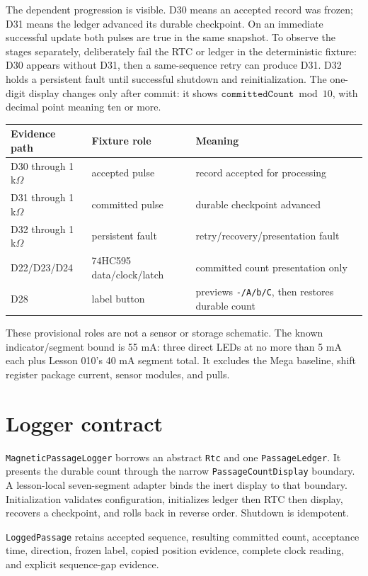 \documentclass[11pt]{article}
\begin{document}
The dependent progression is visible. D30 means an accepted record was frozen;
D31 means the ledger advanced its durable checkpoint. On an immediate
successful update both pulses are true in the same snapshot. To observe the
stages separately, deliberately fail the RTC or ledger in the deterministic
fixture: D30 appears without D31, then a same-sequence retry can produce D31.
D32 holds a persistent fault until successful shutdown and reinitialization.
The one-digit display changes only after commit: it shows
\(\texttt{committedCount}\bmod10\), with decimal point meaning ten or more.

\begin{tabularx}{\linewidth}{@{}l l X@{}}
\toprule
Evidence path & Fixture role & Meaning\\
\midrule
D30 through 1 k\(\Omega\) & accepted pulse & record accepted for processing\\
D31 through 1 k\(\Omega\) & committed pulse & durable checkpoint advanced\\
D32 through 1 k\(\Omega\) & persistent fault & retry/recovery/presentation fault\\
D22/D23/D24 & 74HC595 data/clock/latch & committed count presentation only\\
D28 & label button & previews \texttt{-/A/b/C}, then restores durable count\\
\bottomrule
\end{tabularx}

These provisional roles are not a sensor or storage schematic. The known
indicator/segment bound is 55 mA: three direct LEDs at no more than 5 mA each
plus Lesson 010's 40 mA segment total. It excludes the Mega baseline, shift
register package current, sensor modules, and pulls.

\section{Logger contract}
\texttt{MagneticPassageLogger} borrows an abstract \texttt{Rtc} and one
\texttt{PassageLedger}. It presents the durable count through the narrow
\texttt{PassageCountDisplay} boundary. A lesson-local seven-segment adapter
binds the inert display to that boundary. Initialization
validates configuration, initializes ledger then RTC then display, recovers a
checkpoint, and rolls back in reverse order. Shutdown is idempotent.

\texttt{LoggedPassage} retains accepted sequence, resulting committed count,
acceptance time, direction, frozen label, copied position evidence, complete
clock reading, and explicit sequence-gap evidence.
\end{document}
